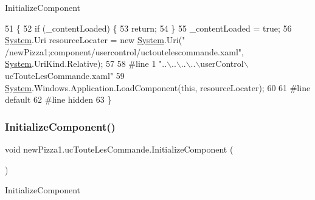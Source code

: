Initialize\+Component 


\begin{DoxyCode}
51                                           \{
52             \textcolor{keywordflow}{if} (\_contentLoaded) \{
53                 \textcolor{keywordflow}{return};
54             \}
55             \_contentLoaded = \textcolor{keyword}{true};
56             \hyperlink{namespaceSystem}{System}.Uri resourceLocater = \textcolor{keyword}{new} \hyperlink{namespaceSystem}{System}.Uri(\textcolor{stringliteral}{"
      /newPizza1;component/usercontrol/uctoutelescommande.xaml"}, \hyperlink{namespaceSystem}{System}.UriKind.Relative);
57             
58 \textcolor{preprocessor}{            #line 1 "..\(\backslash\)..\(\backslash\)..\(\backslash\)..\(\backslash\)userControl\(\backslash\)ucTouteLesCommande.xaml"
}
59             \hyperlink{namespaceSystem}{System}.Windows.Application.LoadComponent(\textcolor{keyword}{this}, resourceLocater);
60             
61 \textcolor{preprocessor}{            #line default
}
62 \textcolor{preprocessor}{            #line hidden
}
63         \}
\end{DoxyCode}
\mbox{\label{classnewPizza1_1_1ucTouteLesCommande_a8349ab5709ac09dd8c7e3f8d2cc0b633}} 
\subsubsection{\texorpdfstring{Initialize\+Component()}{InitializeComponent()}\hspace{0.1cm}{\footnotesize\ttfamily [4/6]}}
{\footnotesize\ttfamily void new\+Pizza1.\+uc\+Toute\+Les\+Commande.\+Initialize\+Component (\begin{DoxyParamCaption}{ }\end{DoxyParamCaption})\hspace{0.3cm}{\ttfamily [inline]}}



Initialize\+Component 



